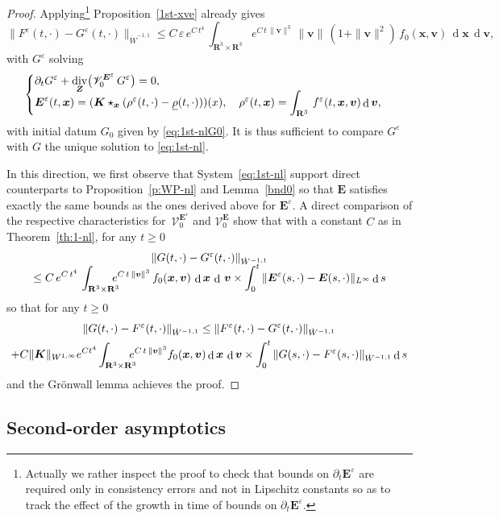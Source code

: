 \documentclass[JEP,XML,SOM,Unicode]{cedram}
\let\mathcal\mathscr
\newenvironment{splitcases}
{\begin{cases}\begin{aligned}}
{\end{aligned}\end{cases}}
\let\eps\varepsilon
\let\d\partial
\DeclareMathOperator\dD{d}\let\dd\dD
\DeclareMathOperator{\Div}{div}
\theoremstyle{plain}
\theoremstyle{definition}
\newcommand\R{\mathbf R}
\newcommand\bE{{\boldsymbol E}}
\newcommand\bK{{\boldsymbol K}}
\newcommand\bfv{{\boldsymbol v}}
\newcommand\bfx{{\boldsymbol x}}
\newcommand\bfZ{{\boldsymbol Z}}
\newcommand\urho{{\underline \rho}}
\newcommand\cV{{\mathcal V}}
\begin{document}
\begin{proof}
Applying\footnote{Actually we rather inspect the proof to check that bounds on $\d_t\bE^\eps$ are required only in consistency errors and not in Lipschitz constants so as to track the effect of the growth in time of bounds on $\d_t\bE^\eps$.} Proposition~\ref{1st-xve} already gives
\[
\|F^\eps(t,\cdot)-G^\eps(t,\cdot)\|_{\dot{W}^{-1,1}}\leq C\,\eps\,e^{C\,t^4}\,\int_{\R^3\times\R^3} e^{C\,t\,\|\bfv\|^3}\,\|\bfv\|\,(1+\|\bfv\|^2)\,f_0(\bfx,\bfv)\,\dD\bfx\,\dD\bfv,
\]
with $G^\eps$ solving
\[
\begin{splitcases}
&\d_t G^\eps+\Div_\bfZ \bigl(\cV_0^{\bE^\eps}\,G^\eps \bigr) =0,\\[-5pt]
&\bE^\eps(t,\bfx)=(\bK\star_{\bfx}(\rho^\eps(t,\cdot)-\urho(t,\cdot)))(x),\quad
\rho^\eps(t,\bfx)=\int_{\R^3}\,f^\eps(t,\bfx,\bfv)\dD \bfv,
\end{splitcases}
\]
with initial datum $G_0$ given by \eqref{eq:1st-nlG0}. It is thus sufficient to compare $G^\eps$
with $G$ the unique solution to \eqref{eq:1st-nl}.

In this direction, we first observe that System~\eqref{eq:1st-nl} support direct counterparts to Proposition~\ref{p:WP-nl} and Lemma~\ref{bnd0} so that $\bE$ satisfies exactly the same bounds as the ones derived above for $\bE^\eps$. A direct comparison of the respective characteristics for~$\cV_0^{\bE^\eps}$ and $\cV_0^{\bE}$ show that with a constant $C$ as in Theorem~\ref{th:1-nl}, for any $t\geq0$
\begin{multline*}
\|G(t,\cdot)-G^\eps(t,\cdot)\|_{\dot{W}^{-1,1}}\\[-5pt]
\leq
C\,e^{C\,t^4}\,\int_{\R^3\times\R^3}\hspace*{-3mm} e^{C\,t\,\|\bfv\|^3}\,f_0(\bfx,\bfv)\,\dD\bfx\,\dD\,\bfv
\times \int_0^t\|\bE^\eps(s,\cdot)-\bE(s,\cdot)\|_{L^\infty}\dD s
\end{multline*}
so that for any $t\geq0$
\begin{multline*}
\|G(t,\cdot)-F^\eps(t,\cdot)\|_{\dot{W}^{-1,1}}\leq \|F^\eps(t,\cdot)-G^\eps(t,\cdot)\|_{\dot{W}^{-1,1}}\\
+C\|\bK\|_{W^{1,\infty}}e^{C t^4}\int_{\R^3\times\R^3}\hspace*{-3mm} e^{C\,t\,\|\bfv\|^3}f_0(\bfx,\bfv)\dD\bfx\,\dD\bfv
\times \int_0^t\|G(s,\cdot)-F^\eps(s,\cdot)\|_{\dot{W}^{-1,1}}\dD s
\end{multline*}
and the Grönwall lemma achieves the proof.
\end{proof}

\subsection{Second-order asymptotics}\label{s:2nd-nl}
\end{document}
